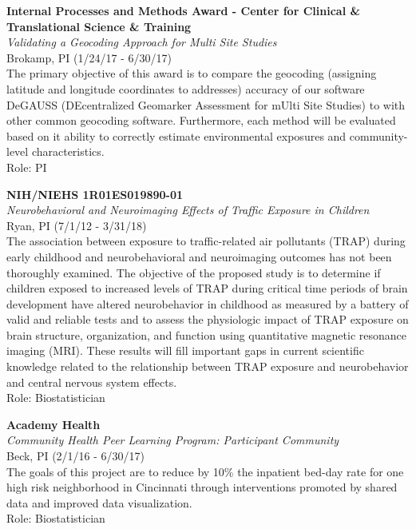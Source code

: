 \documentclass{nihbiosketch}
\begin{document}
\bigskip

\textbf{Internal Processes and Methods Award - Center for Clinical \&
	Translational Science \& Training}\\
\emph{Validating a Geocoding Approach for Multi Site Studies}\\
Brokamp, PI (1/24/17 - 6/30/17)\\
The primary objective of this award is to compare the geocoding
(assigning latitude and longitude coordinates to addresses) accuracy of
our software DeGAUSS (DEcentralized Geomarker Assessment for mUlti Site
Studies) to with other common geocoding software. Furthermore, each
method will be evaluated based on it ability to correctly estimate
environmental exposures and community-level characteristics.\\
Role: PI

\bigskip

\textbf{NIH/NIEHS 1R01ES019890-01}\\
\emph{Neurobehavioral and Neuroimaging Effects of Traffic Exposure in
	Children}\\
Ryan, PI (7/1/12 - 3/31/18)\\
The association between exposure to traffic-related air pollutants
(TRAP) during early childhood and neurobehavioral and neuroimaging
outcomes has not been thoroughly examined. The objective of the proposed
study is to determine if children exposed to increased levels of TRAP
during critical time periods of brain development have altered
neurobehavior in childhood as measured by a battery of valid and
reliable tests and to assess the physiologic impact of TRAP exposure on
brain structure, organization, and function using quantitative magnetic
resonance imaging (MRI). These results will fill important gaps in
current scientific knowledge related to the relationship between TRAP
exposure and neurobehavior and central nervous system effects.\\
Role: Biostatistician

\bigskip

\textbf{Academy Health}\\
\emph{Community Health Peer Learning Program: Participant Community}\\
Beck, PI (2/1/16 - 6/30/17)\\
The goals of this project are to reduce by 10\% the inpatient bed-day
rate for one high risk neighborhood in Cincinnati through interventions
promoted by shared data and improved data visualization.\\
Role: Biostatistician
\end{document}

